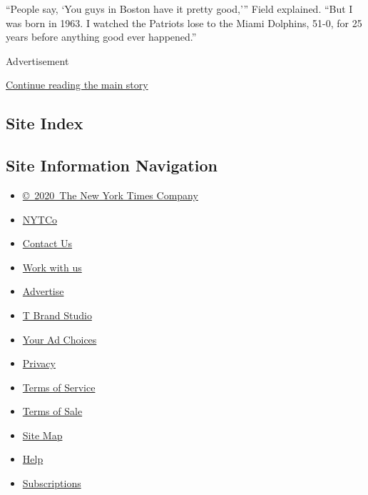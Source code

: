 ``People say, `You guys in Boston have it pretty good,''' Field
explained. ``But I was born in 1963. I watched the Patriots lose to the
Miami Dolphins, 51-0, for 25 years before anything good ever happened.''

Advertisement

\protect\hyperlink{after-bottom}{Continue reading the main story}

\hypertarget{site-index}{%
\subsection{Site Index}\label{site-index}}

\hypertarget{site-information-navigation}{%
\subsection{Site Information
Navigation}\label{site-information-navigation}}

\begin{itemize}
\tightlist
\item
  \href{https://help.nytimes3xbfgragh.onion/hc/en-us/articles/115014792127-Copyright-notice}{©~2020~The
  New York Times Company}
\end{itemize}

\begin{itemize}
\tightlist
\item
  \href{https://www.nytco.com/}{NYTCo}
\item
  \href{https://help.nytimes3xbfgragh.onion/hc/en-us/articles/115015385887-Contact-Us}{Contact
  Us}
\item
  \href{https://www.nytco.com/careers/}{Work with us}
\item
  \href{https://nytmediakit.com/}{Advertise}
\item
  \href{http://www.tbrandstudio.com/}{T Brand Studio}
\item
  \href{https://www.nytimes3xbfgragh.onion/privacy/cookie-policy\#how-do-i-manage-trackers}{Your
  Ad Choices}
\item
  \href{https://www.nytimes3xbfgragh.onion/privacy}{Privacy}
\item
  \href{https://help.nytimes3xbfgragh.onion/hc/en-us/articles/115014893428-Terms-of-service}{Terms
  of Service}
\item
  \href{https://help.nytimes3xbfgragh.onion/hc/en-us/articles/115014893968-Terms-of-sale}{Terms
  of Sale}
\item
  \href{https://spiderbites.nytimes3xbfgragh.onion}{Site Map}
\item
  \href{https://help.nytimes3xbfgragh.onion/hc/en-us}{Help}
\item
  \href{https://www.nytimes3xbfgragh.onion/subscription?campaignId=37WXW}{Subscriptions}
\end{itemize}

